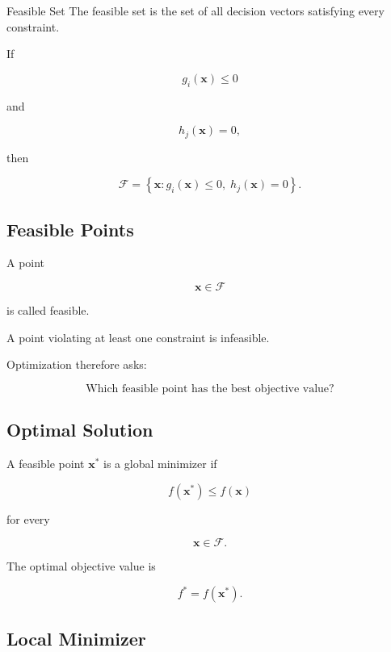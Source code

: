 \begin{definitionbox}{Feasible Set}
The feasible set is the set of all decision vectors satisfying every
constraint.
\end{definitionbox}

If

\[
g_i(\mathbf{x})\leq0
\]

and

\[
h_j(\mathbf{x})=0,
\]

then

\[
\boxed{
\mathcal{F}
=
\left\{
\mathbf{x}:
g_i(\mathbf{x})\leq0,
\;
h_j(\mathbf{x})=0
\right\}.
}
\]

\subsection{Feasible Points}
\label{subsec:feasible-points}

A point

\[
\mathbf{x}\in\mathcal{F}
\]

is called feasible.

A point violating at least one constraint is infeasible.

Optimization therefore asks:

\[
\boxed{
\text{Which feasible point has the best objective value?}
}
\]

\subsection{Optimal Solution}
\label{subsec:optimal-solution}

A feasible point \(\mathbf{x}^*\) is a global minimizer if

\[
\boxed{
f(\mathbf{x}^*)
\leq
f(\mathbf{x})
}
\]

for every

\[
\mathbf{x}\in\mathcal{F}.
\]

The optimal objective value is

\[
\boxed{
f^*
=
f(\mathbf{x}^*).
}
\]

\subsection{Local Minimizer}
\label{subsec:local-minimizer}

